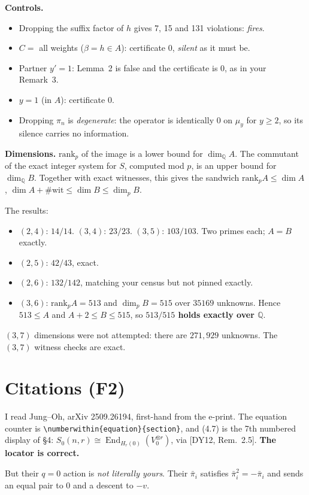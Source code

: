 \documentclass[11pt]{article}
\newcommand{\End}{\operatorname{End}}
\begin{document}
\textbf{Controls.}
\begin{itemize}[nosep]
\item Dropping the suffix factor of $h$ gives 7, 15 and 131 violations: \emph{fires}.
\item $C=$ all weights ($\beta=h\in A$): certificate $0$, \emph{silent} as it must be.
\item Partner $y'=1$: Lemma~2 is false and the certificate is $0$, as in your Remark~3.
\item $y=1$ (in $A$): certificate $0$.
\item Dropping $\pi_n$ is \emph{degenerate}: the operator is identically $0$ on $\mu_y$ for $y\ge2$, so its silence carries no information.
\end{itemize}

\textbf{Dimensions.} $\mathrm{rank}_p$ of the image is a lower bound for $\dim_{\mathbb Q}A$. The commutant of the exact integer system for $S$, computed mod $p$, is an upper bound for $\dim_{\mathbb Q}B$. Together with exact witnesses, this gives the sandwich $\mathrm{rank}_pA\le\dim A$, $\dim A+\#\text{wit}\le\dim B\le\dim_pB$.

The results:
\begin{itemize}[nosep]
\item $(2,4)$: $14/14$. $(3,4)$: $23/23$. $(3,5)$: $103/103$. Two primes each; $A=B$ exactly.
\item $(2,5)$: $42/43$, exact.
\item $(2,6)$: $132/142$, matching your census but not pinned exactly.
\item $(3,6)$: $\mathrm{rank}_pA=513$ and $\dim_pB=515$ over $35169$ unknowns. Hence $513\le A$ and $A+2\le B\le515$, so \textbf{$513/515$ holds exactly over $\mathbb Q$}.
\end{itemize}
$(3,7)$ dimensions were not attempted: there are $271{,}929$ unknowns. The $(3,7)$ witness checks are exact.

\section{Citations (F2)}
I read Jung--Oh, arXiv 2509.26194, first-hand from the e-print. The equation counter is \verb|\numberwithin{equation}{section}|, and (4.7) is the 7th numbered display of \S4: $S_0(n,r)\cong\End_{H_r(0)}(V_0^{\otimes r})$, via [DY12, Rem.~2.5]. \textbf{The locator is correct.}

But their $q=0$ action is \emph{not literally yours}. Their $\bar\pi_i$ satisfies $\bar\pi_i^2=-\bar\pi_i$ and sends an equal pair to $0$ and a descent to $-v$.
\end{document}
